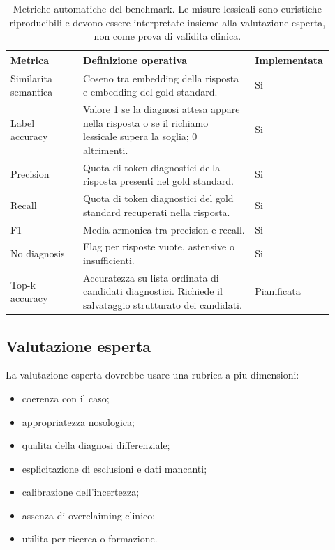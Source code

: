 \documentclass[11pt,a4paper]{article}
\begin{document}
\begin{table}[htbp]
\centering
\begin{tabular}{p{0.22\linewidth}p{0.52\linewidth}p{0.18\linewidth}}
\toprule
\textbf{Metrica} & \textbf{Definizione operativa} & \textbf{Implementata}\\
\midrule
Similarita semantica & Coseno tra embedding della risposta e embedding del gold standard. & Si\\
Label accuracy & Valore 1 se la diagnosi attesa appare nella risposta o se il richiamo lessicale supera la soglia; 0 altrimenti. & Si\\
Precision & Quota di token diagnostici della risposta presenti nel gold standard. & Si\\
Recall & Quota di token diagnostici del gold standard recuperati nella risposta. & Si\\
F1 & Media armonica tra precision e recall. & Si\\
No diagnosis & Flag per risposte vuote, astensive o insufficienti. & Si\\
Top-k accuracy & Accuratezza su lista ordinata di candidati diagnostici. Richiede il salvataggio strutturato dei candidati. & Pianificata\\
\bottomrule
\end{tabular}
\caption{Metriche automatiche del benchmark. Le misure lessicali sono euristiche riproducibili e devono essere interpretate insieme alla valutazione esperta, non come prova di validita clinica.}
\label{tab:automatic-metrics-it}
\end{table}

\subsection{Valutazione esperta}
La valutazione esperta dovrebbe usare una rubrica a piu dimensioni:
\begin{itemize}
  \item coerenza con il caso;
  \item appropriatezza nosologica;
  \item qualita della diagnosi differenziale;
  \item esplicitazione di esclusioni e dati mancanti;
  \item calibrazione dell'incertezza;
  \item assenza di overclaiming clinico;
  \item utilita per ricerca o formazione.
\end{itemize}
\end{document}
